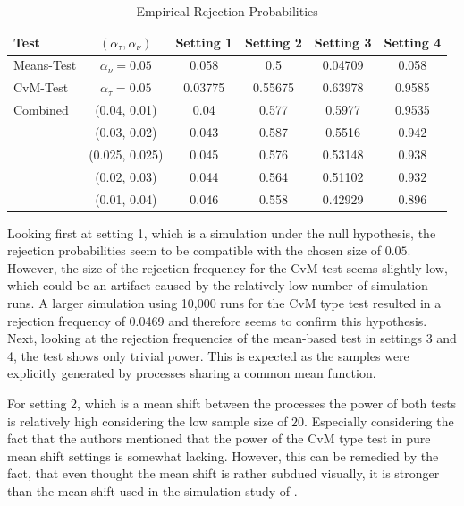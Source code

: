 \documentclass[12pt, a4paper]{article}
\theoremstyle{MAstyle} \newtheorem{assumption}{Assumption}[section]
\theoremstyle{MAstyle} \newtheorem{definition}{Definition}[section]
\theoremstyle{MAstyle} \newtheorem{theorem}{Theorem}[section]
\begin{document}
		\begin{table}[H]
			\centering
			\begin{tabular}{l|c|cccc}\toprule
				\textbf{Test}	&$\left(\alpha_{\tau}, \alpha_{\nu}\right) $ &\textbf{Setting 1} &\textbf{Setting 2}	&\textbf{Setting 3} &\textbf{Setting 4}\\
				\midrule
				Means-Test		&$\alpha_{\nu} = 0.05$	& 0.058		& 0.5  	 	& 0.04709	& 0.058 	\\
				CvM-Test 		&$\alpha_{\tau} = 0.05$	& 0.03775	& 0.55675  	& 0.63978 	& 0.9585	\\
				\midrule	
				Combined		& (0.04, 0.01)			& 0.04		& 0.577  	& 0.5977 	& 0.9535	\\
								& (0.03, 0.02)			& 0.043		& 0.587  	& 0.5516 	& 0.942 	\\
								& (0.025, 0.025)		& 0.045		& 0.576  	& 0.53148 	& 0.938		\\
								& (0.02, 0.03)			& 0.044		& 0.564  	& 0.51102 	& 0.932		\\
								& (0.01, 0.04)			& 0.046		& 0.558  	& 0.42929 	& 0.896		\\
				\bottomrule
			\end{tabular}
			\caption{Empirical Rejection Probabilities}
		\end{table}
		Looking first at setting 1, which is a simulation under the null hypothesis, the rejection probabilities seem to be compatible with the chosen size of $0.05$. However, the size of the rejection frequency for the CvM test seems slightly low, which could be an artifact caused by the relatively low number of simulation runs. A larger simulation using 10,000 runs for the CvM type test resulted in a rejection frequency of 0.0469 and therefore seems to confirm this hypothesis.
		Next, looking at the rejection frequencies of the mean-based test in settings 3 and 4, the test shows only trivial power. This is expected as the samples were explicitly generated by processes sharing a common mean function. 
		
		For setting 2, which is a mean shift between the processes the power of both tests is relatively high considering the low sample size of $20$. Especially considering the fact that the authors mentioned that the power of the CvM type test in pure mean shift settings is somewhat lacking. However, this can be remedied by the fact, that even thought the mean shift is rather subdued visually, it is stronger than the mean shift used in the simulation study of \cite{bugni_permutation_2021}.
		
\end{document}
